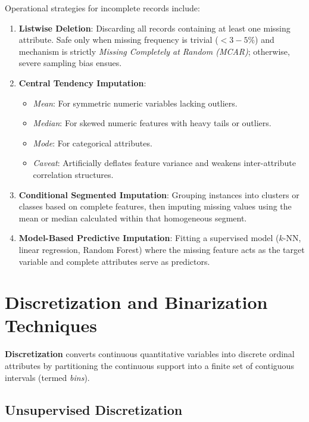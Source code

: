 Operational strategies for incomplete records include:

\begin{enumerate}
    \item \textbf{Listwise Deletion}: Discarding all records containing at least one missing attribute. Safe only when missing frequency is trivial ($< 3-5\%$) and mechanism is strictly \textit{Missing Completely at Random (MCAR)}; otherwise, severe sampling bias ensues.
    \item \textbf{Central Tendency Imputation}:
    \begin{itemize}[noitemsep]
        \item \textit{Mean}: For symmetric numeric variables lacking outliers.
        \item \textit{Median}: For skewed numeric features with heavy tails or outliers.
        \item \textit{Mode}: For categorical attributes.
        \item \textit{Caveat}: Artificially deflates feature variance and weakens inter-attribute correlation structures.
    \end{itemize}
    \item \textbf{Conditional Segmented Imputation}: Grouping instances into clusters or classes based on complete features, then imputing missing values using the mean or median calculated within that homogeneous segment.
    \item \textbf{Model-Based Predictive Imputation}: Fitting a supervised model ($k$-NN, linear regression, Random Forest) where the missing feature acts as the target variable and complete attributes serve as predictors.
\end{enumerate}

\section{Discretization and Binarization Techniques}
\label{sec:dm-discretization-binning}

\textbf{Discretization} converts continuous quantitative variables into discrete ordinal attributes by partitioning the continuous support into a finite set of contiguous intervals (termed \textit{bins}).

\subsection{Unsupervised Discretization}

